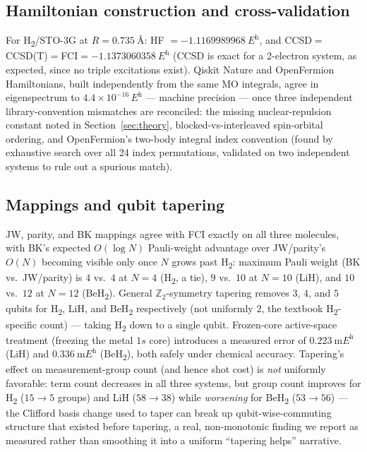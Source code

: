 \documentclass[11pt]{article}
\begin{document}
\subsection{Hamiltonian construction and cross-validation}
For H\textsubscript{2}/STO-3G at $R=\qty{0.735}{\angstrom}$: HF
$=\qty{-1.1169989968}{\hartree}$, and
CCSD$=$CCSD(T)$=$FCI$=\qty{-1.1373060358}{\hartree}$ (CCSD is exact for a
2-electron system, as expected, since no triple excitations exist). Qiskit
Nature and OpenFermion Hamiltonians, built independently from the same MO
integrals, agree in eigenspectrum to $4.4\times10^{-16}\,\unit{\hartree}$ ---
machine precision --- once three independent library-convention mismatches
are reconciled: the missing nuclear-repulsion constant noted in
Section~\ref{sec:theory}, blocked-vs-interleaved spin-orbital ordering, and
OpenFermion's two-body integral index convention (found by exhaustive search
over all 24 index permutations, validated on two independent systems to rule
out a spurious match).

\subsection{Mappings and qubit tapering}
JW, parity, and BK mappings agree with FCI exactly on all three molecules,
with BK's expected $O(\log N)$ Pauli-weight advantage over JW/parity's
$O(N)$ becoming visible only once $N$ grows past H\textsubscript{2}: maximum
Pauli weight (BK vs.\ JW/parity) is $4$ vs.\ $4$ at $N=4$ (H\textsubscript{2},
a tie), $9$ vs.\ $10$ at $N=10$ (LiH), and $10$ vs.\ $12$ at $N=12$
(BeH\textsubscript{2}). General $\mathbb{Z}_2$-symmetry tapering removes $3$,
$4$, and $5$ qubits for H\textsubscript{2}, LiH, and BeH\textsubscript{2}
respectively (not uniformly $2$, the textbook H\textsubscript{2}-specific
count) --- taking H\textsubscript{2} down to a single qubit. Frozen-core
active-space treatment (freezing the metal $1s$ core) introduces a measured
error of $\qty{0.223}{\milli\hartree}$ (LiH) and $\qty{0.336}{\milli\hartree}$
(BeH\textsubscript{2}), both safely under chemical accuracy. Tapering's effect
on measurement-group count (and hence shot cost) is \emph{not} uniformly
favorable: term count decreases in all three systems, but group count
improves for H\textsubscript{2} ($15\!\to\!5$ groups) and LiH
($58\!\to\!38$) while \emph{worsening} for BeH\textsubscript{2}
($53\!\to\!56$) --- the Clifford basis change used to taper can break up
qubit-wise-commuting structure that existed before tapering, a real,
non-monotonic finding we report as measured rather than smoothing it into a
uniform ``tapering helps'' narrative.
\end{document}
